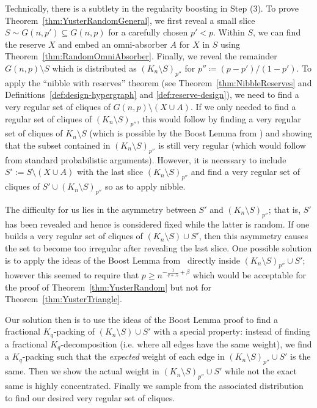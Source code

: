 \documentclass[11pt]{article}
\numberwithin{equation}{section}
\newcounter{i}
\theoremstyle{plain}
\theoremstyle{plain} %
\theoremstyle{definition}
\begin{document}
Technically, there is a subtlety in the regularity boosting in Step (3). 
To prove Theorem~\ref{thm:YusterRandomGeneral}, we first reveal a small slice $S \sim G(n,p') \subseteq G(n,p)$ for a carefully chosen $p' < p$.  Within $S$, we can find the reserve $X$ and embed an omni-absorber $A$ for $X$ in $S$ using Theorem~\ref{thm:RandomOmniAbsorber}.
Finally, we reveal the remainder $G(n,p)\setminus S$ which is distributed as $(K_n \setminus S)_{p''}$ for $p'' \coloneqq (p - p')/(1 - p')$. 
To apply the ``nibble with reserves'' theorem (see Theorem~\ref{thm:NibbleReserves} and Definitions~\ref{def:design-hypergraph} and \ref{def:reserve-design}), we need to find a very regular set of cliques of $G(n,p)\setminus (X \cup A)$.  
If we only needed to find a regular set of cliques of $(K_n\setminus S)_{p''}$, this would follow by finding a very regular set of cliques of $K_n\setminus S$ (which is possible by the Boost Lemma from \cite{GKLO16}) and showing that the subset contained in $(K_n\setminus S)_{p''}$ is still very regular (which would follow from standard probabilistic arguments).
However, it is necessary to include $S':=S\setminus (X \cup A)$ with the last slice $(K_n\setminus S)_{p''}$ and find a very regular set of cliques of $S'\cup (K_n\setminus S)_{p''}$ so as to apply nibble.


The difficulty for us lies in the asymmetry between $S'$ and $(K_n\setminus S)_{p''}$; that is, $S'$ has been revealed and hence is considered fixed while the latter is random. If one builds a very regular set of cliques of $(K_n\setminus S)\cup S'$, then this asymmetry causes the set to become too irregular after revealing the last slice. One possible solution is to apply the ideas of the Boost Lemma from~\cite{GKLO16} directly inside $(K_n\setminus S)_{p''}\cup S'$; however this seemed to require that $p\geq n^{-\frac{1}{q+.5}+\beta}$ which would be acceptable for the proof of Theorem~\ref{thm:YusterRandom} but not for Theorem~\ref{thm:YusterTriangle}. 

Our solution then is to use the ideas of the Boost Lemma proof to find a fractional $K_q$-packing of $(K_n\setminus S)\cup S'$ with a special property: instead of finding a fractional $K_q$-decomposition (i.e. where all edges have the same weight), we find a $K_q$-packing such that the \emph{expected} weight of each edge in $(K_n\setminus S)_{p''}\cup S'$ is the same. Then we show the actual weight in $(K_n\setminus S)_{p''}\cup S'$ while not the exact same is highly concentrated. Finally we sample from the associated distribution to find our desired very regular set of cliques. 
\end{document}
